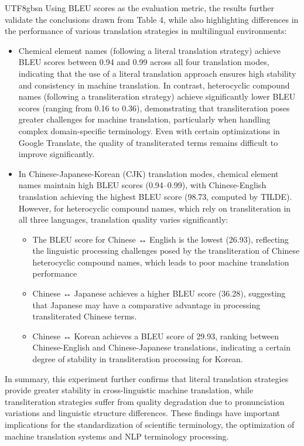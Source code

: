 \documentclass[conference]{IEEEtran}
\begin{document}
\begin{CJK*}{UTF8}{gbsn}
Using BLEU scores as the evaluation metric, the results further validate the conclusions drawn from Table 4, while also highlighting differences in the performance of various translation strategies in multilingual environments:
\begin{itemize}
    
\item Chemical element names (following a literal translation strategy) achieve BLEU scores between 0.94 and 0.99 across all four translation modes, indicating that the use of a literal translation approach ensures high stability and consistency in machine translation. In contrast, heterocyclic compound names (following a transliteration strategy) achieve significantly lower BLEU scores (ranging from 0.16 to 0.36), demonstrating that transliteration poses greater challenges for machine translation, particularly when handling complex domain-specific terminology. Even with certain optimizations in Google Translate, the quality of transliterated terms remains difficult to improve significantly.

\item In Chinese-Japanese-Korean (CJK) translation modes, chemical element names maintain high BLEU scores (0.94–0.99), with Chinese-English translation achieving the highest BLEU score (98.73, computed by TILDE). However, for heterocyclic compound names, which rely on transliteration in all three languages, translation quality varies significantly:
\begin{itemize}
    
\item The BLEU score for Chinese ↔ English is the lowest (26.93), reflecting the linguistic processing challenges posed by the transliteration of Chinese heterocyclic compound names, which leads to poor machine translation performance
\item Chinese ↔ Japanese achieves a higher BLEU score (36.28), suggesting that Japanese may have a comparative advantage in processing transliterated Chinese terms.
\item Chinese ↔ Korean achieves a BLEU score of 29.93, ranking between Chinese-English and Chinese-Japanese translations, indicating a certain degree of stability in transliteration processing for Korean. 
\end{itemize}
\end{itemize}
In summary, this experiment further confirms that literal translation strategies provide greater stability in cross-linguistic machine translation, while transliteration strategies suffer from quality degradation due to pronunciation variations and linguistic structure differences. These findings have important implications for the standardization of scientific terminology, the optimization of machine translation systems and NLP terminology processing.


\end{CJK*}
\end{document}
